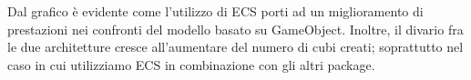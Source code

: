 Dal grafico è evidente come l'utilizzo di ECS porti ad un miglioramento di prestazioni nei confronti del modello basato su GameObject. Inoltre, il divario fra le due architetture cresce all'aumentare del numero di cubi creati; soprattutto nel caso in cui utilizziamo ECS in combinazione con gli altri package.
